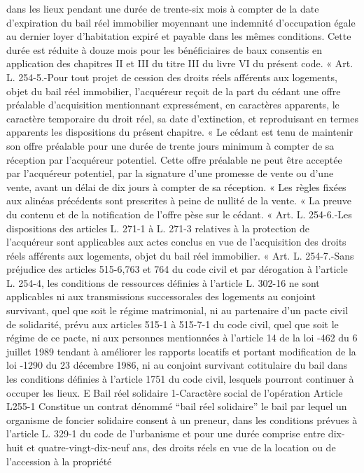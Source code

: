 \documentclass[11pt,a4paper]{report}
\begin{document}
dans les lieux pendant une durée de trente-six mois à compter de la date d'expiration du bail réel immobilier
moyennant une indemnité d'occupation égale au dernier loyer d'habitation expiré et payable dans les mêmes
conditions. Cette durée est réduite à douze mois pour les bénéficiaires de baux consentis en application des
chapitres II et III du titre III du livre VI du présent code.
« Art. L. 254-5.-Pour tout projet de cession des droits réels afférents aux logements, objet du bail réel
immobilier, l'acquéreur reçoit de la part du cédant une offre préalable d'acquisition mentionnant expressément,
en caractères apparents, le caractère temporaire du droit réel, sa date d'extinction, et reproduisant en termes
apparents les dispositions du présent chapitre.
« Le cédant est tenu de maintenir son offre préalable pour une durée de trente jours minimum à compter de sa
réception par l'acquéreur potentiel. Cette offre préalable ne peut être acceptée par l'acquéreur potentiel, par la
signature d'une promesse de vente ou d'une vente, avant un délai de dix jours à compter de sa réception.
« Les règles fixées aux alinéas précédents sont prescrites à peine de nullité de la vente.
« La preuve du contenu et de la notification de l'offre pèse sur le cédant.
« Art. L. 254-6.-Les dispositions des articles L. 271-1 à L. 271-3 relatives à la protection de l'acquéreur sont
applicables aux actes conclus en vue de l'acquisition des droits réels afférents aux logements, objet du bail réel
immobilier.
« Art. L. 254-7.-Sans préjudice des articles 515-6,763 et 764 du code civil et par dérogation à l'article L. 254-4,
les conditions de ressources définies à l'article L. 302-16 ne sont applicables ni aux transmissions successorales
des logements au conjoint survivant, quel que soit le régime matrimonial, ni au partenaire d'un pacte civil de
solidarité, prévu aux articles 515-1 à 515-7-1 du code civil, quel que soit le régime de ce pacte, ni aux personnes
mentionnées à l'article 14 de la loi -462 du 6 juillet 1989 tendant à améliorer les rapports locatifs et
portant modification de la loi -1290 du 23 décembre 1986, ni au conjoint survivant cotitulaire du bail dans
les conditions définies à l'article 1751 du code civil, lesquels pourront continuer à occuper les lieux.
E Bail réel solidaire
1-Caractère social de l’opération
Article L255-1
Constitue un contrat dénommé “bail réel solidaire” le bail par lequel un organisme de foncier solidaire consent
à un preneur, dans les conditions prévues à l'article L. 329-1 du code de l'urbanisme et pour une durée comprise
entre dix-huit et quatre-vingt-dix-neuf ans, des droits réels en vue de la location ou de l'accession à la propriété
\end{document}
